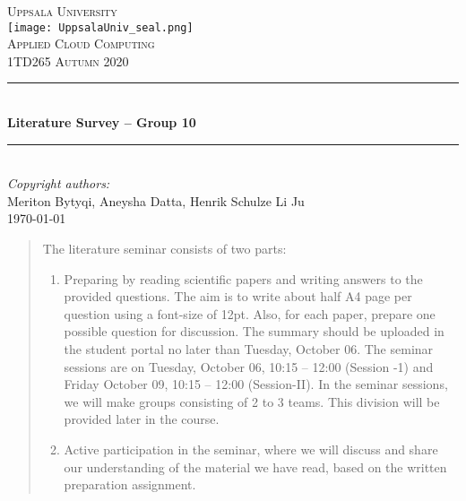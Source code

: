 \documentclass[a4paper,12pt]{article}
\begin{document}
\newcommand{\HRule}{\rule{\linewidth}{0.5mm}}
\begin{titlepage}
\begin{center}
\textsc{\LARGE Uppsala University}\\[0.4cm] %
\texttt{[image: UppsalaUniv\_seal.png]}\\[0.5cm]
\textsc{\Large Applied Cloud Computing}\\[0.3cm]
\textsc{\Large 1TD265 Autumn 2020}
\\[0.5cm] %
 \HRule \\[0.4cm]
 { \LARGE \bfseries Literature Survey -- Group 10}\\ %
 \HRule \\[0.4cm]
 \large \emph{Copyright authors:} \\[0.2cm]
 
 Meriton Bytyqi,
 Aneysha Datta,
 Henrik Schulze
 Li Ju\\[1cm]
 \large \today
\end{center}
 \begin{abstract}
The literature seminar consists of two parts:
 \begin{enumerate}
  \item
  Preparing by reading scientific papers and writing answers to the
  provided questions. The aim is to write about half A4 page per question using a
  font-size of 12pt. Also, for each paper, prepare one possible question for
  discussion. The summary should be uploaded in the student portal no
  later than Tuesday, October 06. The seminar sessions are on
  Tuesday, October 06, 10:15 – 12:00 (Session -1) and Friday October
  09, 10:15 – 12:00 (Session-II). In the seminar sessions, we will make
  groups consisting of 2 to 3 teams. This division will be provided later in
  the course.
  \item
  Active participation in the seminar, where we will discuss and share our
  understanding of the material we have read, based on the written
  preparation assignment.
  \end{enumerate}
 \end{abstract}
\end{titlepage}
\end{document}

